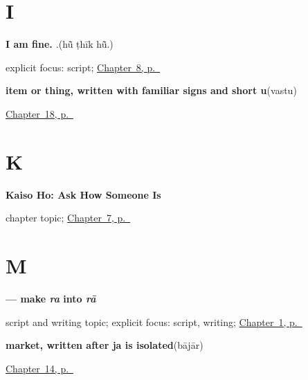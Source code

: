 \section*{I}

\noindent\begin{minipage}[t]{\linewidth}
\raggedright
\textbf{I am fine.}\enspace\emph{  .}\enspace(hū̃ ṭhīk hū̃.)\par
\footnotesize explicit focus: script; \hyperref[ch:mw-wellbeing-answer]{Chapter~8, p.~\pageref*{ch:mw-wellbeing-answer}}
\end{minipage}\par\smallskip

\noindent\begin{minipage}[t]{\linewidth}
\raggedright
\textbf{item or thing, written with familiar signs and short u}\enspace\emph{}\enspace(vastu)\par
\footnotesize \hyperref[ch:mw-shopping-three]{Chapter~18, p.~\pageref*{ch:mw-shopping-three}}
\end{minipage}\par\smallskip

\section*{K}

\noindent\begin{minipage}[t]{\linewidth}
\raggedright
\textbf{Kaiso Ho: Ask How Someone Is}\par
\footnotesize chapter topic; \hyperref[ch:mw-wellbeing-question]{Chapter~7, p.~\pageref*{ch:mw-wellbeing-question}}
\end{minipage}\par\smallskip

\section*{M}

\noindent\begin{minipage}[t]{\linewidth}
\raggedright
\textbf{ — make \emph{ra} into \emph{rā}}\par
\footnotesize script and writing topic; explicit focus: script, writing; \hyperref[ch:mw-ram-ram-sa]{Chapter~1, p.~\pageref*{ch:mw-ram-ram-sa}}
\end{minipage}\par\smallskip

\noindent\begin{minipage}[t]{\linewidth}
\raggedright
\textbf{market, written after ja is isolated}\enspace\emph{}\enspace(bājār)\par
\footnotesize \hyperref[ch:mw-places-three]{Chapter~14, p.~\pageref*{ch:mw-places-three}}
\end{minipage}\par\smallskip

